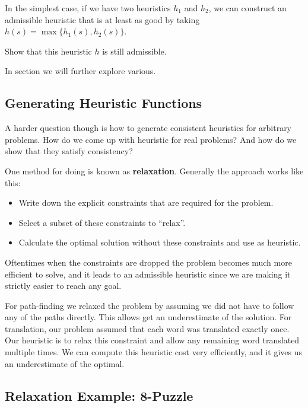 \documentclass[10pt]{article}
\begin{document}
In the simplest case, if we have two heuristics $h_1$ and $h_2$, we
can construct an admissible heuristic that is at least as good by
taking $h(s) = \max\{ h_1(s), h_2(s)\}$.

\begin{exercise}
  Show that this heuristic $h$ is still admissible.
\end{exercise}
    
In section we will further explore various.

\subsection{Generating Heuristic Functions}

A harder question though is how to generate consistent heuristics for arbitrary problems. How do we come up with heuristic for real problems? And how do we show that they satisfy consistency? 

One method for doing is known as \textbf{relaxation}. Generally the approach works like this:

\begin{itemize}
\item Write down the explicit constraints that are required for the problem. 
\item Select a subset of these constraints to ``relax''.
\item Calculate the optimal solution without these constraints and use as heuristic.   
\end{itemize}

Oftentimes when the constraints are dropped the problem becomes much more efficient to solve, and it leads to an admissible heuristic since we are making it strictly easier to reach any goal.

For path-finding we relaxed the problem by assuming we did not have to follow any of the paths directly. This allows get an underestimate of the solution. For translation, our problem assumed that each word was translated exactly once. Our heuristic is to relax this constraint and allow any remaining word translated multiple times. We can compute this heuristic cost very efficiently, and it gives us an underestimate of the optimal. 




\subsection{Relaxation Example: 8-Puzzle}
\end{document}

